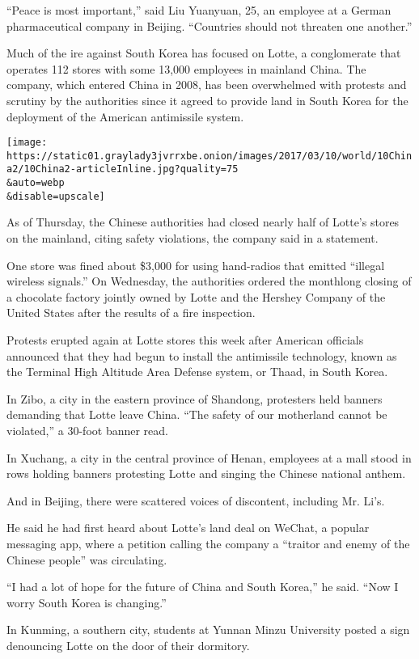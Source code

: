 ``Peace is most important,'' said Liu Yuanyuan, 25, an employee at a
German pharmaceutical company in Beijing. ``Countries should not
threaten one another.''

Much of the ire against South Korea has focused on Lotte, a conglomerate
that operates 112 stores with some 13,000 employees in mainland China.
The company, which entered China in 2008, has been overwhelmed with
protests and scrutiny by the authorities since it agreed to provide land
in South Korea for the deployment of the American antimissile system.

\texttt{[image: https://static01.graylady3jvrrxbe.onion/images/2017/03/10/world/10China2/10China2-articleInline.jpg?quality=75\\\&auto=webp\\\&disable=upscale]}

As of Thursday, the Chinese authorities had closed nearly half of
Lotte's stores on the mainland, citing safety violations, the company
said in a statement.

One store was fined about \$3,000 for using hand-radios that emitted
``illegal wireless signals.'' On Wednesday, the authorities ordered the
monthlong closing of a chocolate factory jointly owned by Lotte and the
Hershey Company of the United States after the results of a fire
inspection.

Protests erupted again at Lotte stores this week after American
officials announced that they had begun to install the antimissile
technology, known as the Terminal High Altitude Area Defense system, or
Thaad, in South Korea.

In Zibo, a city in the eastern province of Shandong, protesters held
banners demanding that Lotte leave China. ``The safety of our motherland
cannot be violated,'' a 30-foot banner read.

In Xuchang, a city in the central province of Henan, employees at a mall
stood in rows holding banners protesting Lotte and singing the Chinese
national anthem.

And in Beijing, there were scattered voices of discontent, including Mr.
Li's.

He said he had first heard about Lotte's land deal on WeChat, a popular
messaging app, where a petition calling the company a ``traitor and
enemy of the Chinese people'' was circulating.

``I had a lot of hope for the future of China and South Korea,'' he
said. ``Now I worry South Korea is changing.''

In Kunming, a southern city, students at Yunnan Minzu University posted
a sign denouncing Lotte on the door of their dormitory.


